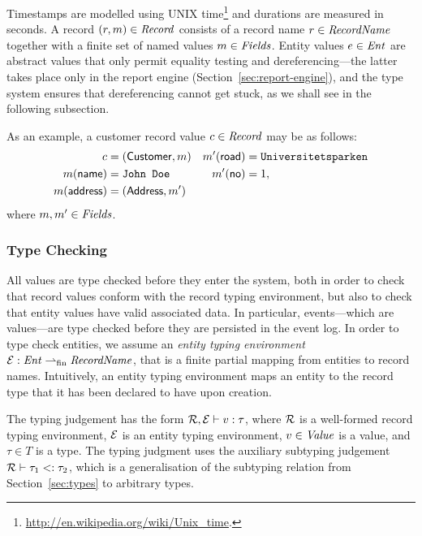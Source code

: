 Timestamps are modelled using UNIX
time\footnote{\url{http://en.wikipedia.org/wiki/Unix_time}.} and
durations are measured in seconds. A record $(r,m)\in \mathit{Record}$
consists of a record name $r \in \mathit{RecordName}$ together with a
finite set of named values $m \in \mathit{Fields}$. Entity values $e
\in \mathit{Ent}$ are abstract values that only permit equality
testing and dereferencing---the latter takes place only in the
report engine (Section~\ref{sec:report-engine}), and the type system
ensures that dereferencing cannot get stuck, as we shall see in the
following subsection.

\begin{example}
  \label{ex:recVal}
  As an example, a customer record value $c \in \mathit{Record}$ may be as
  follows:
  \begin{align*}
    c &= (\mathsf{Customer},m) & m'(\mathsf{road}) &=
    \texttt{Universitetsparken}\\
    m(\mathsf{name}) &= \texttt{John Doe} & m'(\mathsf{no})
    &= 1,\\
    m(\mathsf{address}) &= (\mathsf{Address},m')
  \end{align*}
  where $m,m' \in \mathit{Fields}$.
\end{example}

\subsubsection{Type Checking}
\label{sec:type-checking}

All values are type checked before they enter the system, both in
order to check that record values conform with the record typing
environment, but also to check that entity values have valid
associated data. In particular, events---which are values---are type
checked before they are persisted in the event log. In order to type
check entities, we assume an \emph{entity typing environment}
${\mathcal E} : \mathit{Ent}\rightharpoonup_{\mathrm{fin}}\mathit{RecordName}$, that is a finite partial
mapping from entities to record names. Intuitively, an entity typing
environment maps an entity to the record type that it has been
declared to have upon creation.

The typing judgement has the form ${\mathcal R}, {\mathcal E} \vdash v : \tau$,
where ${\mathcal R}$ is a well-formed record typing environment, ${\mathcal E}$ is
an entity typing environment, $v \in \mathit{Value}$ is a value, and $\tau
\in T$ is a type. The typing judgment uses the auxiliary subtyping
judgement ${\mathcal R} \vdash \tau_1 <: \tau_2$, which is a
generalisation of the subtyping relation from Section~\ref{sec:types}
to arbitrary types.


